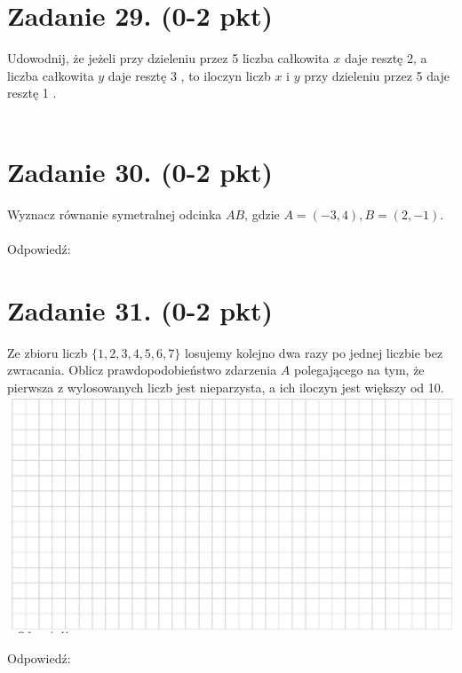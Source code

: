 \documentclass[10pt]{article}
\begin{document}
\section*{Zadanie 29. (0-2 pkt)}
Udowodnij, że jeżeli przy dzieleniu przez 5 liczba całkowita \(x\) daje resztę 2, a liczba całkowita \(y\) daje resztę 3 , to iloczyn liczb \(x\) i \(y\) przy dzieleniu przez 5 daje resztę 1 .\\
\(\qquad\)

\section*{Zadanie 30. (0-2 pkt)}
Wyznacz równanie symetralnej odcinka \(A B\), gdzie \(A=(-3,4), B=(2,-1)\).\\
\(\qquad\)\\
Odpowiedź:

\section*{Zadanie 31. (0-2 pkt)}
Ze zbioru liczb \(\{1,2,3,4,5,6,7\}\) losujemy kolejno dwa razy po jednej liczbie bez zwracania. Oblicz prawdopodobieństwo zdarzenia \(A\) polegającego na tym, że pierwsza z wylosowanych liczb jest nieparzysta, a ich iloczyn jest większy od 10.\\
\includegraphics[max width=\textwidth, center]{2024_11_21_b8ac5f500a5bbb1b4ec5g-14}

Odpowiedź:
\end{document}
